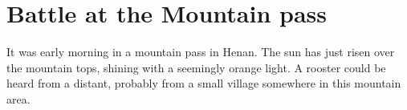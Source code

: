 \chapter{Battle at the Mountain pass}
It was early morning in a mountain pass in Henan. The sun has just risen over the mountain tops, shining with a seemingly orange light. A rooster could be heard from a distant, probably from a small village somewhere in this mountain area. 
